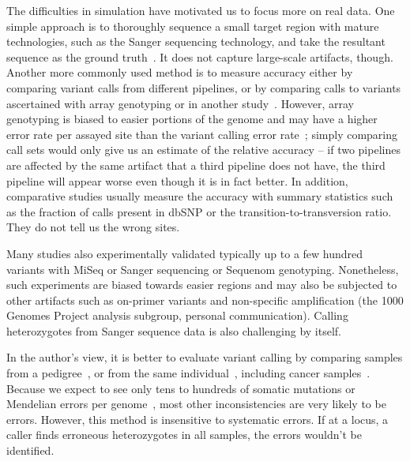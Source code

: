 \documentclass{bioinfo}
\begin{document}
The difficulties in simulation have motivated us to focus more on real data. One
simple approach is to thoroughly sequence a small target region with mature
technologies, such as the Sanger sequencing technology, and take the resultant sequence as
the ground truth~\citep{Harismendy:2009aa}. It does not capture large-scale
artifacts, though. Another more commonly used method is to measure accuracy
either by comparing variant calls from different pipelines, or by comparing
calls to variants ascertained with array genotyping or in another
study~\citep{Clark:2011aa,Li:2012fk,Lam:2012aa,Lam:2012fk,Boland:2013aa,Liu:2013aa,Goode:2013aa,ORawe:2013aa,Zook:2014aa,Cheng:2014aa}.
However, array genotyping is biased to easier portions of the genome and may have a higher error rate per assayed site than
the variant calling error rate~\citep{Bentley:2008cr}; simply comparing call
sets would only give us an estimate of the relative accuracy -- if two
pipelines are affected by the same artifact that a third pipeline does
not have, the third pipeline will appear worse even though it is in fact
better.  In addition, comparative studies usually measure the accuracy with
summary statistics such as the fraction of calls present in dbSNP or the
transition-to-transversion ratio.  They do not tell us the wrong sites.

Many studies also experimentally validated typically up to a few hundred
variants with MiSeq or Sanger sequencing or Sequenom genotyping. Nonetheless,
such experiments are biased towards easier regions and may also be subjected
to other artifacts such as on-primer variants and non-specific amplification
(the 1000 Genomes Project analysis subgroup, personal communication).
Calling heterozygotes from Sanger sequence data is also challenging by itself.


In the author's view, it is better to evaluate variant calling by
comparing samples from a pedigree~\citep{Zook:2014aa}, or from the same
individual~\citep{Nickles:2012aa}, including cancer
samples~\citep{Lower:2012aa}. Because we expect to see only tens to hundreds of
somatic mutations or Mendelian errors per genome~\citep{Conrad:2011kx}, most other inconsistencies
are very likely to be errors. However, this method is insensitive to systematic
errors.  If at a locus, a caller finds erroneous heterozygotes in all samples,
the errors wouldn't be identified.
\end{document}
